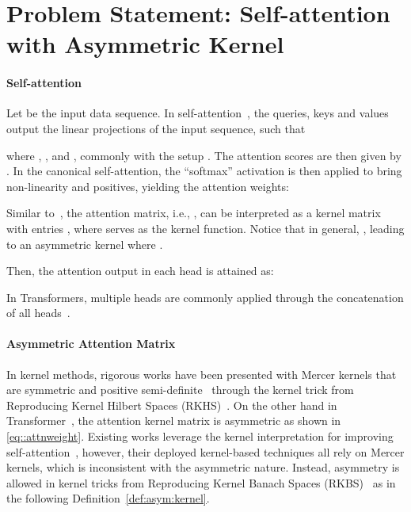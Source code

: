 \documentclass{article}
\begin{document}
	
	
	
	\section{Problem Statement: Self-attention with Asymmetric Kernel}
	\label{sec::problem_statesment}
	
	
	\paragraph{Self-attention}
	Let  be the input data sequence. 
	In self-attention~\cite{vaswani2017attention},
	the queries, keys and values output the linear projections of the input sequence, such that
	
	where , , and , commonly with the setup .
	The attention scores are then given by 
	.
	In the canonical self-attention, the ``softmax'' activation is then applied to bring non-linearity and positives, yielding the attention weights:
	
	Similar to~\cite{tsai2019}, the attention matrix, i.e., , can be interpreted as a kernel matrix with entries , where  serves as the kernel function. 
	Notice that in general, , leading to an asymmetric kernel where .
	
	
	Then, the attention output  in each head is attained as:
	
	In Transformers, multiple heads are commonly applied through the concatenation of all heads~\cite{vaswani2017attention}.
	
	
	
	
	\paragraph{Asymmetric Attention Matrix} 
	In kernel methods, rigorous works have been presented with Mercer kernels that are symmetric and positive semi-definite~\cite{mercer1909} through the kernel trick from Reproducing Kernel Hilbert Spaces (RKHS)~\cite{vapnik1999overview}. 
	On the other hand in Transformer~\cite{vaswani2017attention}, the attention kernel matrix is asymmetric as shown in \eqref{eq::attnweight}.  
	Existing works leverage the kernel interpretation for improving self-attention~\cite{choromanski2021rethinking,nguyen2022fourierformer,chi2022kerple,nguyen2023a}, however, their deployed kernel-based techniques all rely on Mercer kernels, which is inconsistent with the asymmetric {nature}.  
	Instead, asymmetry is allowed in kernel tricks from Reproducing Kernel Banach Spaces (RKBS)~\cite{zhang2009reproducing} as in the following Definition~\ref{def:asym:kernel}. 
	
\end{document}
